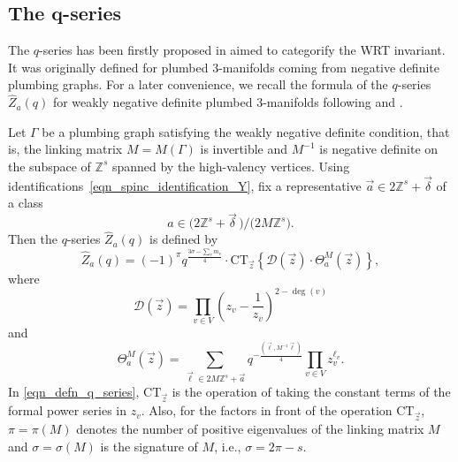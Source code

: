 \subsection[The q-series]{The $\boldsymbol{q}$-series}

The $ q $-series has been firstly proposed in \cite{gppv} aimed to categorify the WRT invariant. It was originally defined for plumbed 3-manifolds coming from negative definite plumbing graphs. For a later convenience, we recall the formula of the $ q $-series $ \hat{Z}_a(q) $ for weakly negative definite plumbed 3-manifolds following \cite{gukov} and \cite{gppv}.

Let $ \Gamma $ be a plumbing graph satisfying the weakly negative definite condition, that is, the linking matrix $ M=M(\Gamma) $ is invertible and $ M^{-1} $ is negative definite on the subspace of $\mathbb{Z}^s$ spanned by the high-valency vertices. Using identifications~\eqref{eqn_spinc_identification_Y}, fix a representative $ \vec{a}\in 2\mathbb{Z}^s+\vec{\delta} $ of a class
\[
a\in \big(2\mathbb{Z}^s+\vec{\delta}\,\big)/\big(2M\mathbb{Z}^s\big).
\]
Then the $ q $-series $ \hat{Z}_a(q) $ is defined by
\begin{equation}\label{eqn_defn_q_series}
	\hat{Z}_a(q)=(-1)^{\pi}  q^{\frac{3\sigma-\sum_v m_v}{4}} \cdot \text{CT}_{\vec{z}}\left\{ \mathcal{D}(\vec{z}) \cdot \Theta_a^{M}(\vec{z})\right\},
\end{equation}
where
\begin{equation}\label{eqn_defn_discriminant_q_series}
	\mathcal{D}(\vec{z})=\prod_{v\in V} \left(z_v-\frac{1}{z_v}\right)^{2-\deg(v)}
\end{equation}
and
\begin{equation}\label{eqn_defn_Theta_function_q_series}
	\Theta_a^{M}(\vec{z})=\sum_{\vec{\ell}\in 2M\mathbb{Z}^s+\vec{a}} q^{-\frac{(\vec{\ell},M^{-1}\vec{\ell})}{4}} \prod_{v\in V} z_v^{\ell_v}.
\end{equation}
In \eqref{eqn_defn_q_series}, $ \text{CT}_{\vec{z}}$ is the operation of taking the constant terms of the formal power series in $z_v$. Also, for the factors in front of the operation $ \text{CT}_{\vec{z}}$, $ \pi=\pi(M) $ denotes the number of positive eigenvalues of the linking matrix $ M $ and $ \sigma=\sigma(M) $ is the signature of $ M $, i.e., $ \sigma=2\pi-s $.

